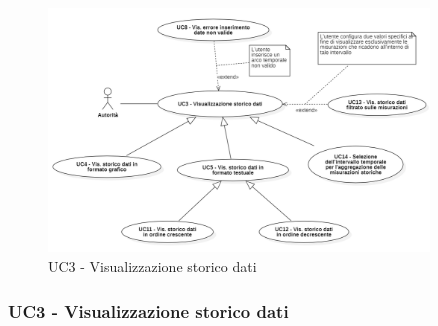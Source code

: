 \documentclass{article}
\begin{document}
\begin{figure}[H]
    \centering
    \includegraphics[width=0.9\textwidth]{Images/uc3.png}
    \caption{UC3 - Visualizzazione storico dati }
    \label{fig:UC3}
\end{figure}
\subsubsection{UC3 - Visualizzazione storico dati }
\end{document}
